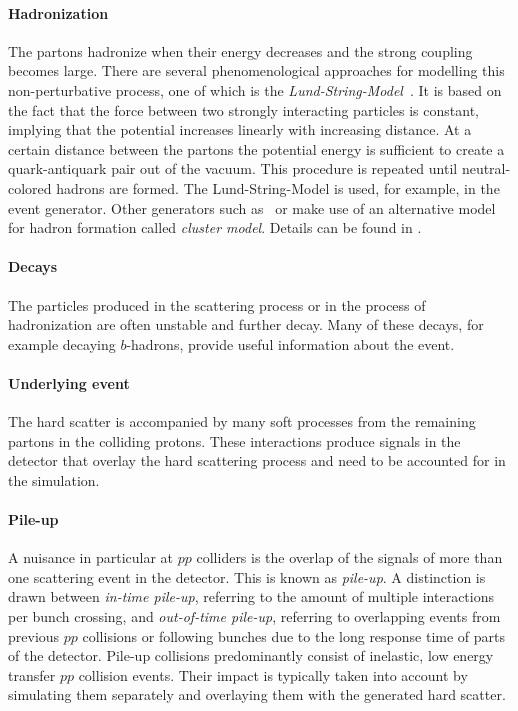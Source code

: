 \paragraph{Hadronization}
The partons hadronize when their energy decreases and the strong coupling becomes large. There are several phenomenological approaches for modelling this non-perturbative process, one of which is the \emph{Lund-String-Model}~\cite{Andersson:1983ia}. 
It is based on the fact that the force between two strongly interacting particles is constant, implying that the potential increases linearly with increasing distance.
At a certain distance between the partons the potential energy is sufficient to create a quark-antiquark pair out of the vacuum. This procedure is repeated until neutral-colored hadrons are formed.
The Lund-String-Model is used, for example, in the \Pythia event generator. Other generators such as \HERWING\ or \Sherpa make use of an alternative model for hadron formation called \emph{cluster model}. Details can be found in . 
\paragraph{Decays}
The particles produced in the scattering process or in the process of hadronization are often unstable and further decay. Many of these decays, for example decaying $b$-hadrons, provide useful information about the event. %
\paragraph{Underlying event}
The hard scatter is accompanied by many soft processes from the remaining partons in the colliding protons. These interactions produce signals in the detector that overlay the hard scattering process and need to be accounted for in the simulation.
\paragraph{Pile-up}
A nuisance in particular at $pp$ colliders is the overlap of the signals of more than one scattering event in the detector. This is known as \emph{pile-up}. A distinction is drawn between \emph{in-time pile-up}, referring to the amount of multiple interactions per bunch crossing, and \emph{out-of-time pile-up}, referring to overlapping events from previous $pp$ collisions or following bunches due to the long response time of parts of the detector.
Pile-up collisions predominantly consist of inelastic, low energy transfer $pp$ collision events. 
Their impact is typically taken into account by simulating them separately and overlaying them with the generated hard scatter.
